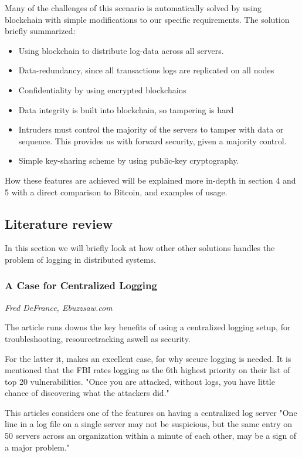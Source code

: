 Many of the challenges of this scenario is automatically solved by
using blockchain with simple modifications to our specific
requirements. The solution briefly summarized:
\begin{itemize}
    \item Using blockchain to distribute log-data across all servers.
    \item Data-redundancy, since all transactions logs are replicated on all nodes
    \item Confidentiality by using encrypted blockchains
    \item Data integrity is built into blockchain, so tampering is hard
    \item Intruders must control the majority of the servers to tamper with data or sequence. This provides us with forward security, given a majority control.
    \item Simple key-sharing scheme by using public-key cryptography.
\end{itemize}

How these features are achieved will be explained more in-depth in section 4 and 5 with a direct comparison to Bitcoin, and examples of usage.

\subsection{Literature review}
In this section we will briefly look at how other other solutions
handles the problem of logging in distributed systems.

\subsubsection{A Case for Centralized Logging }
\vspace{-3mm}
{\footnotesize \it Fred DeFrance, Ebuzzsaw.com}~\cite{defrance}

The article runs downs the key benefits of using a centralized logging
setup, for troubleshooting, resourcetracking aswell as security.

For the latter it, makes an excellent case, for why secure logging is
needed. It is mentioned that the FBI rates logging as the 6th highest
priority on their list of top 20 vulnerabilities. "Once you are
attacked, without logs, you have little chance of discovering what the
attackers did."~\cite{defrance}

This articles considers one of the features on having a centralized
log server "One line in a log file on a single server may not be
suspicious, but the same entry on 50 servers across an organization
within a minute of each other, may be a sign of a major
problem."~\cite{defrance}

